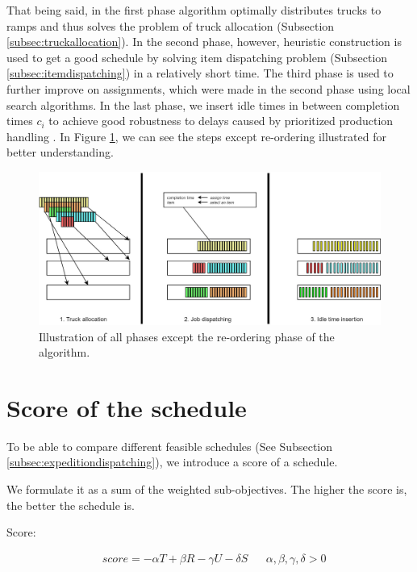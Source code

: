 \documentclass{ctuthesis}
\begin{document}
That being said, in the first phase algorithm optimally distributes trucks to ramps and thus solves the problem of truck allocation (Subsection \ref{subsec:truckallocation}). In the second phase, however, heuristic construction is used to get a good schedule by solving item dispatching problem (Subsection \ref{subsec:itemdispatching}) in a relatively short time. The third phase is used to further improve on assignments, which were made in the second phase using local search algorithms. In the last phase, we insert idle times in between completion times $c_i$ to achieve good robustness to delays caused by prioritized production handling \cite{pinedo}. In Figure \ref{fig:algo}, we can see the steps except re-ordering illustrated for better understanding.

\begin{figure}[H]
\includegraphics[width=1.0\linewidth]{algo.jpg}
\caption{Illustration of all phases except the re-ordering phase of the algorithm.}
\label{fig:algo}
\end{figure}

\section{Score of the schedule}
\label{sec:score}

To be able to compare different feasible schedules (See Subsection \ref{subsec:expeditiondispatching}), we introduce a score of a schedule. 

We formulate it as a sum of the weighted sub-objectives. The higher the score is, the better the schedule is.

Score:

\begin{equation}
\begin{aligned}
    &score = -\alpha T + \beta R - \gamma  U - \delta S && \alpha, \beta, \gamma, \delta > 0
\end{aligned}
\end{equation}
\end{document}
